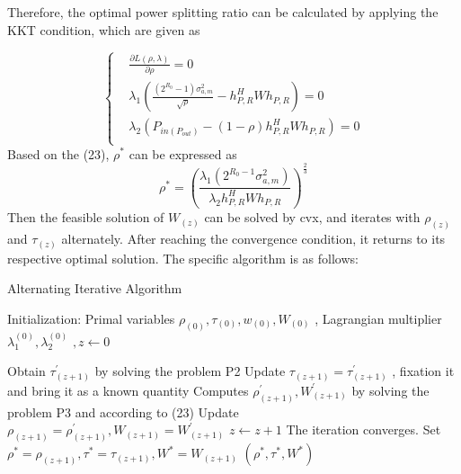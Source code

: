 \documentclass[conference]{IEEEtran}
\begin{document}
Therefore, the optimal power splitting ratio can be calculated by applying the KKT condition, which are given as

\begin{equation}
\left\{
\begin{aligned}
&\frac{\partial L(\rho ,\lambda )}{\partial \rho } = 0\\
&\lambda _{1} (  \frac{\left ( 2^{R_{0} }-1  \right )\sigma _{a,m}^{2}  }{\sqrt{\rho } }-h_{P,R}^{H}Wh_{P,R}) = 0\\
&\lambda _{2}(P_{in(P_{out} )} - \left ( 1-\rho  \right )h_{P,R}^{H}Wh_{P,R}) = 0\\
\end{aligned}
\right.
\end{equation}
Based on the (23), $\rho ^{\ast }$ can be expressed as 
\begin{equation}\label{eqn-1}
\rho ^{\ast }=(\frac{\lambda _{1}(2^{R_{0}-1 }\sigma _{a,m}^{2}  ) }{\lambda _{2}h_{P,R}^{H}Wh_{P,R}} )^{\frac{2}{3} }
\end{equation} 
Then the feasible solution of $W_{(z)}$ can be solved by cvx, and iterates with $\rho _{(z)}$ and $\tau _{(z)}$ alternately. After reaching the convergence condition, it returns to its respective optimal solution. The specific algorithm is as follows: 
\begin{algorithm}
	\renewcommand{\algorithmicrequire}{\textbf{Input:}}
	\renewcommand{\algorithmicensure}{\textbf{Output:}}
	\caption{Alternating Iterative Algorithm}
	\label{alg1}
	\begin{algorithmic}[1]
		\STATE Initialization: Primal variables $\rho _{(0)} ,\tau _{(0)} , w _{(0)},W _{(0)}$ , Lagrangian multiplier $\lambda _{1}^{(0)}  ,\lambda _{2}^{(0)}$ $ , z \leftarrow 0$
		
		\REPEAT
		\STATE Obtain $ \tau _{(z+1)}^{\prime }  $ by solving the problem P2
		\STATE Update $ \tau _{(z+1)} = \tau _{(z+1)}^{\prime }$ , fixation it and bring it as a known quantity
		\STATE Computes $\rho _{(z+1)}^{\prime } , W_{(z+1)}^{\prime }$ by solving the problem P3 and according to (23)
		\STATE Update $ \rho _{(z+1)} = \rho _{(z+1)}^{\prime } , W_{(z+1)} = W_{(z+1)}^{\prime }$
		\STATE $z \leftarrow z + 1$
		\UNTIL The iteration converges.
		\STATE   Set $  \rho ^{\ast } =\rho _{(z+1)}  , \tau ^{\ast } =\tau _{(z+1)} , W ^{\ast } =W _{(z+1)}   $
		\ENSURE  $(\rho ^{\ast } ,\tau ^{\ast } , W ^{\ast })$
	\end{algorithmic}  
\end{algorithm}
\end{document}
